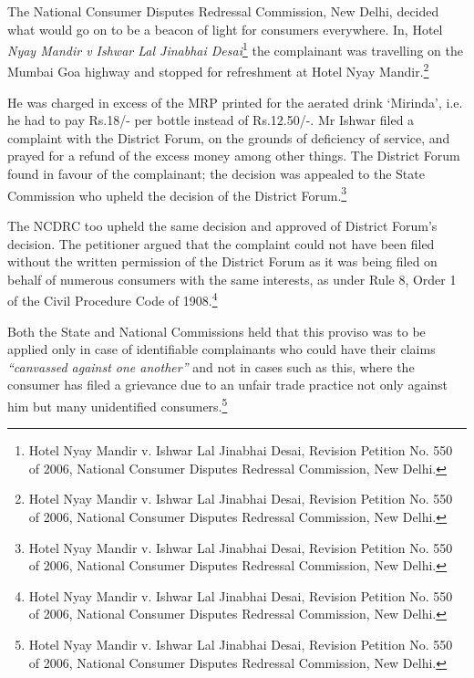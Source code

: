 \begin{multicols}{2}
\noi
The National Consumer Disputes Redressal Commission, New Delhi, decided what would go
on to be a beacon of light for consumers everywhere. In, Hotel \textit{Nyay Mandir v Ishwar Lal
Jinabhai Desai}\footnote{Hotel Nyay Mandir v. Ishwar Lal Jinabhai Desai, Revision Petition No. 550 of 2006, National Consumer Disputes Redressal Commission, New Delhi.} the complainant was travelling on the Mumbai Goa highway and stopped for refreshment at Hotel Nyay Mandir.\footnote{Hotel Nyay Mandir v. Ishwar Lal Jinabhai Desai, Revision Petition No. 550 of 2006, National Consumer Disputes Redressal Commission, New Delhi.}

\noi
He was charged in excess of the MRP printed for the aerated drink ‘Mirinda’, i.e. he had to pay
Rs.18/- per bottle instead of Rs.12.50/-. Mr Ishwar filed a complaint with the District Forum,
on the grounds of deficiency of service, and prayed for a refund of the excess money among
other things. The District Forum found in favour of the complainant; the decision was appealed
to the State Commission who upheld the decision of the District Forum.\footnote{Hotel Nyay Mandir v. Ishwar Lal Jinabhai Desai, Revision Petition No. 550 of 2006, National Consumer Disputes Redressal Commission, New Delhi.}

\noi
The NCDRC too upheld the same decision and approved of District Forum’s decision. The
petitioner argued that the complaint could not have been filed without the written permission
of the District Forum as it was being filed on behalf of numerous consumers with the same
interests, as under Rule 8, Order 1 of the Civil Procedure Code of 1908.\footnote{Hotel Nyay Mandir v. Ishwar Lal Jinabhai Desai, Revision Petition No. 550 of 2006, National Consumer Disputes Redressal Commission, New Delhi.}

\noi
Both the State and National Commissions held that this proviso was to be applied only in case
of identifiable complainants who could have their claims \textit{“canvassed against one another”} and
not in cases such as this, where the consumer has filed a grievance due to an unfair trade
practice not only against him but many unidentified consumers.\footnote{Hotel Nyay Mandir v. Ishwar Lal Jinabhai Desai, Revision Petition No. 550 of 2006, National Consumer Disputes Redressal Commission, New Delhi.}

\vspace{-.1cm}


\end{multicols}
